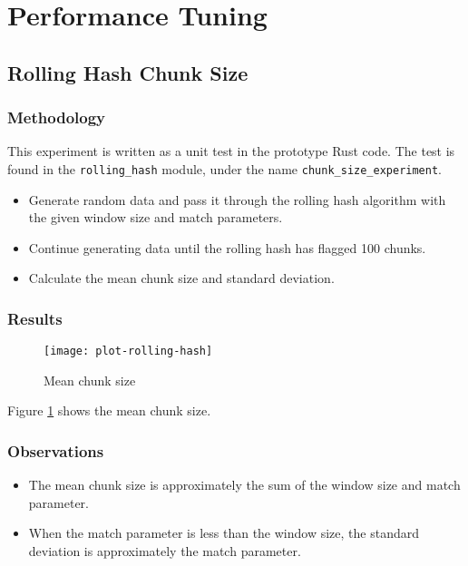 \documentclass[12pt,a4paper,two-side]{book}
\begin{document}
\fi


\section{Performance Tuning}


\subsection{Rolling Hash Chunk Size}

\subsubsection{Methodology}

This experiment is written as a unit test in the prototype Rust code. The test
is found in the \texttt{rolling\_hash} module, under the name
\texttt{chunk\_size\_experiment}.

\begin{itemize}

  \item Generate random data and pass it through the rolling hash algorithm with
    the given window size and match parameters.

  \item Continue generating data until the rolling hash has flagged 100 chunks.

  \item Calculate the mean chunk size and standard deviation.

\end{itemize}

\subsubsection{Results}

\begin{figure}[p]
  \caption{Mean chunk size}
  \label{fig:plot-rolling-hash}
  \centering
    \texttt{[image: plot-rolling-hash]}
\end{figure}

Figure \ref{fig:plot-rolling-hash} shows the mean chunk size.

\subsubsection{Observations}

\begin{itemize}

  \item The mean chunk size is approximately the sum of the window size and
    match parameter.

  \item When the match parameter is less than the window size, the standard
    deviation is approximately the match parameter.

\end{itemize}
\end{document}
